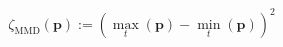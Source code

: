 \begin{equation}
	\zeta_\text{MMD}(\textbf{p}) := (\max_t(\textbf{p}) - \min_t(\textbf{p}))^2
	\label{ch2:equ:cost-min-max}
\end{equation}